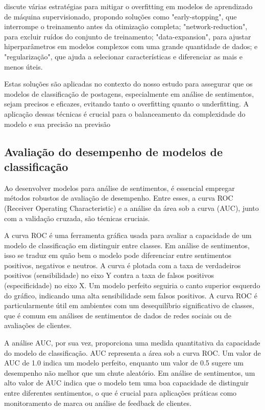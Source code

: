  discute várias estratégias para mitigar o overfitting em modelos de aprendizado de máquina supervisionado, propondo soluções como "early-stopping", que interrompe o treinamento antes da otimização completa; "network-reduction", para excluir ruídos do conjunto de treinamento; "data-expansion", para ajustar hiperparâmetros em modelos complexos com uma grande quantidade de dados; e "regularização", que ajuda a selecionar características e diferenciar as mais e menos úteis.

Estas soluções são aplicadas no contexto do nosso estudo para assegurar que os modelos de classificação de postagens, especialmente em análise de sentimentos, sejam precisos e eficazes, evitando tanto o overfitting quanto o underfitting. A aplicação dessas técnicas é crucial para o balanceamento da complexidade do modelo e sua precisão na previsão

\subsection{Avaliação do desempenho de modelos de classificação}

Ao desenvolver modelos para análise de sentimentos, é essencial empregar métodos robustos de avaliação de desempenho. Entre esses, a curva ROC (Receiver Operating Characteristic) e a análise da área sob a curva (AUC), junto com a validação cruzada, são técnicas cruciais.

A curva ROC é uma ferramenta gráfica usada para avaliar a capacidade de um modelo de classificação em distinguir entre classes. Em análise de sentimentos, isso se traduz em quão bem o modelo pode diferenciar entre sentimentos positivos, negativos e neutros. A curva é plotada com a taxa de verdadeiros positivos (sensibilidade) no eixo Y contra a taxa de falsos positivos (especificidade) no eixo X. Um modelo perfeito seguiria o canto superior esquerdo do gráfico, indicando uma alta sensibilidade sem falsos positivos. A curva ROC é particularmente útil em ambientes com um desequilíbrio significativo de classes, que é comum em análises de sentimentos de dados de redes sociais ou de avaliações de clientes.

A análise AUC, por sua vez, proporciona uma medida quantitativa da capacidade do modelo de classificação. AUC representa a área sob a curva ROC. Um valor de AUC de 1.0 indica um modelo perfeito, enquanto um valor de 0.5 sugere um desempenho não melhor que um chute aleatório. Em análise de sentimentos, um alto valor de AUC indica que o modelo tem uma boa capacidade de distinguir entre diferentes sentimentos, o que é crucial para aplicações práticas como monitoramento de marca ou análise de feedback de clientes.


